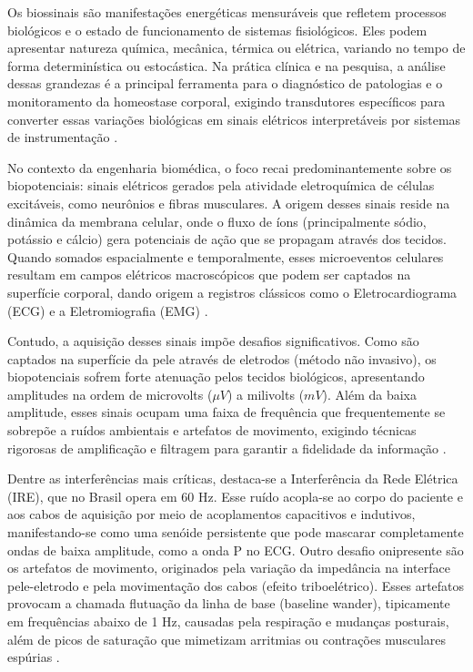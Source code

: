 \documentclass[tcc,capa]{texufpel}
\begin{document}
Os biossinais são manifestações energéticas mensuráveis que refletem processos biológicos e o estado de funcionamento de sistemas fisiológicos. Eles podem apresentar natureza química, mecânica, térmica ou elétrica, variando no tempo de forma determinística ou estocástica. Na prática clínica e na pesquisa, a análise dessas grandezas é a principal ferramenta para o diagnóstico de patologias e o monitoramento da homeostase corporal, exigindo transdutores específicos para converter essas variações biológicas em sinais elétricos interpretáveis por sistemas de instrumentação \cite{carr2001}.

No contexto da engenharia biomédica, o foco recai predominantemente sobre os biopotenciais: sinais elétricos gerados pela atividade eletroquímica de células excitáveis, como neurônios e fibras musculares. A origem desses sinais reside na dinâmica da membrana celular, onde o fluxo de íons (principalmente sódio, potássio e cálcio) gera potenciais de ação que se propagam através dos tecidos. Quando somados espacialmente e temporalmente, esses microeventos celulares resultam em campos elétricos macroscópicos que podem ser captados na superfície corporal, dando origem a registros clássicos como o Eletrocardiograma (ECG) e a Eletromiografia (EMG) \cite{marchetti2006}.

Contudo, a aquisição desses sinais impõe desafios significativos. Como são captados na superfície da pele através de eletrodos (método não invasivo), os biopotenciais sofrem forte atenuação pelos tecidos biológicos, apresentando amplitudes na ordem de microvolts ($\mu V$) a milivolts ($mV$). Além da baixa amplitude, esses sinais ocupam uma faixa de frequência que frequentemente se sobrepõe a ruídos ambientais e artefatos de movimento, exigindo técnicas rigorosas de amplificação e filtragem para garantir a fidelidade da informação \cite{balbinot2019v1}.

Dentre as interferências mais críticas, destaca-se a Interferência da Rede Elétrica (IRE), que no Brasil opera em 60 Hz. Esse ruído acopla-se ao corpo do paciente e aos cabos de aquisição por meio de acoplamentos capacitivos e indutivos, manifestando-se como uma senóide persistente que pode mascarar completamente ondas de baixa amplitude, como a onda P no ECG. Outro desafio onipresente são os artefatos de movimento, originados pela variação da impedância na interface pele-eletrodo e pela movimentação dos cabos (efeito triboelétrico). Esses artefatos provocam a chamada flutuação da linha de base (baseline wander), tipicamente em frequências abaixo de 1 Hz, causadas pela respiração e mudanças posturais, além de picos de saturação que mimetizam arritmias ou contrações musculares espúrias \cite{marchetti2006, balbinot2019v1}.
\end{document}

